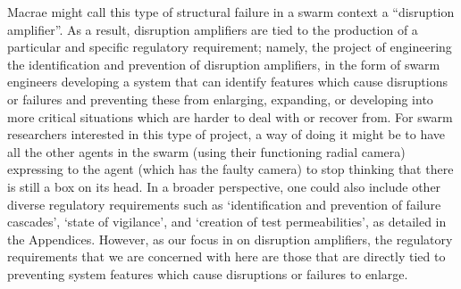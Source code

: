 \documentclass[lettersize,journal]{IEEEtran}
\begin{document}
Macrae \cite{macrae2021learning} might call this type of structural failure in a swarm context a ``disruption amplifier”.  As a result, disruption amplifiers are tied to the production of a particular and specific regulatory requirement; namely, the project of engineering the identification and prevention of disruption amplifiers, in the form of swarm engineers developing a system that can identify features which cause disruptions or failures and preventing these from enlarging, expanding, or developing into more critical situations which are harder to deal with or recover from. For swarm researchers interested in this type of project, a way of doing it might be to have all the other agents in the swarm (using their functioning radial camera) expressing to the agent (which has the faulty camera) to stop thinking that there is still a box on its head. In a broader perspective, one could also include other diverse regulatory requirements such as `identification and prevention of failure cascades’, `state of vigilance’, and `creation of test permeabilities’, as detailed in the Appendices. However, as our focus in on disruption amplifiers, the regulatory requirements that we are concerned with here are those that are directly tied to preventing system features which cause disruptions or failures to enlarge. 
\end{document}
